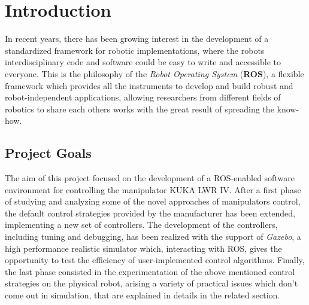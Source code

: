 \section{Introduction}
In recent years, there has been growing interest in the development of a standardized framework for robotic implementations, where the robots interdisciplinary code and software could be easy to write and accessible to everyone. This is the philosophy of the \textit{Robot Operating System} (\textbf{ROS}), a flexible framework which provides all the instruments to develop and build robust and robot-independent applications, allowing researchers from different fields of robotics to share each others works with the great result of spreading the know-how.

\subsection{Project Goals}
The aim of this project focused on the development of a ROS-enabled software environment for controlling the manipulator KUKA LWR IV. After a first phase of studying and analyzing some of the novel approaches of manipulators control, the default control strategies provided by the manufacturer has been extended, implementing a new set of controllers. The development of the controllers, including tuning and debugging, has been realized with the support of \textit{Gazebo}, a high performance realistic simulator which, interacting with ROS, gives the opportunity to test the efficiency of user-implemented control algorithms. Finally, the last phase consisted in the experimentation of the above mentioned control strategies on the physical robot, arising a variety of practical issues which don't come out in simulation, that are explained in details in the related section.

\newpage
